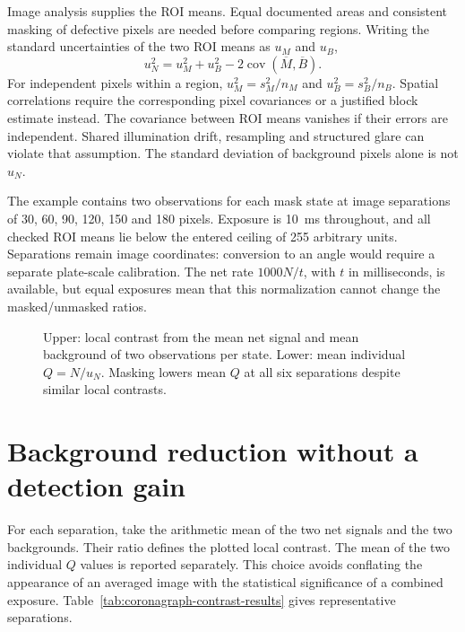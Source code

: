 Image analysis supplies the ROI means. Equal documented areas and consistent masking of defective pixels are needed before comparing regions. Writing the standard uncertainties of the two ROI means as $u_M$ and $u_B$,
\begin{equation}
 u_N^2=u_M^2+u_B^2
       -2\operatorname{cov}(\overline M,\overline B).
 \label{eq:coronagraph-contrast-variance}
\end{equation}
For independent pixels within a region, $u_M^2=s_M^2/n_M$ and $u_B^2=s_B^2/n_B$. Spatial correlations require the corresponding pixel covariances or a justified block estimate instead. The covariance between ROI means vanishes if their errors are independent. Shared illumination drift, resampling and structured glare can violate that assumption. The standard deviation of background pixels alone is not $u_N$.

The example contains two observations for each mask state at image separations of 30, 60, 90, 120, 150 and 180 pixels. Exposure is 10~ms throughout, and all checked ROI means lie below the entered ceiling of 255 arbitrary units. Separations remain image coordinates: conversion to an angle would require a separate plate-scale calibration. The net rate $1000N/t$, with $t$ in milliseconds, is available, but equal exposures mean that this normalization cannot change the masked/unmasked ratios.

\begin{figure}[t]
\centering

\caption{Upper: local contrast from the mean net signal and mean background of two observations per state. Lower: mean individual $Q=N/u_N$. Masking lowers mean $Q$ at all six separations despite similar local contrasts.}
\label{fig:coronagraph-contrast-data}
\end{figure}

\section{Background reduction without a detection gain}
For each separation, take the arithmetic mean of the two net signals and the two backgrounds. Their ratio defines the plotted local contrast. The mean of the two individual $Q$ values is reported separately. This choice avoids conflating the appearance of an averaged image with the statistical significance of a combined exposure. Table~\ref{tab:coronagraph-contrast-results} gives representative separations.

